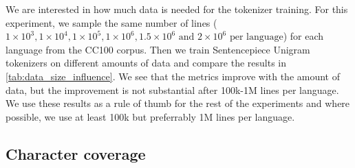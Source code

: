 

We are interested in how much data is needed for the tokenizer training. For this experiment, we sample the same number of lines ($1\times10^{3}, 1\times10^{4}, 1\times10^{5}, 1\times10^{6}, 1.5\times10^{6} \text{ and } 2\times10^{6} \text{ per language}$) for each language from the CC100 corpus. Then we train Sentencepiece Unigram tokenizers on different amounts of data and compare the results in \autoref{tab:data_size_influence}. We see that the metrics improve with the amount of data, but the improvement is not substantial after 100k-1M lines per language. We use these results as a rule of thumb for the rest of the experiments and where possible, we use at least 100k but preferrably 1M lines per language.

\subsection{Character coverage}
\label{sec:character_coverage}



